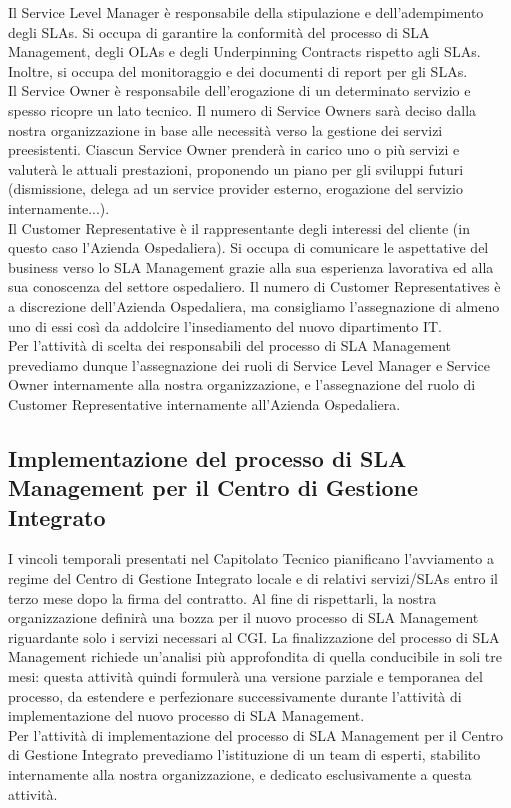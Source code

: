 Il Service Level Manager è responsabile della stipulazione e dell'adempimento degli SLAs. Si occupa di garantire la conformità del processo di SLA Management, degli OLAs e degli Underpinning Contracts rispetto agli SLAs. Inoltre, si occupa del monitoraggio e dei documenti di report per gli SLAs.
\\
Il Service Owner è responsabile dell'erogazione di un determinato servizio e spesso ricopre un lato tecnico. Il numero di Service Owners sarà deciso dalla nostra organizzazione in base alle necessità verso la gestione dei servizi preesistenti. Ciascun Service Owner prenderà in carico uno o più servizi e valuterà le attuali prestazioni, proponendo un piano per gli sviluppi futuri (dismissione, delega ad un service provider esterno, erogazione del servizio internamente...).
\\
Il Customer Representative è il rappresentante degli interessi del cliente (in questo caso l'Azienda Ospedaliera). Si occupa di comunicare le aspettative del business verso lo SLA Management grazie alla sua esperienza lavorativa ed alla sua conoscenza del settore ospedaliero. Il numero di Customer Representatives è a discrezione dell'Azienda Ospedaliera, ma consigliamo l'assegnazione di almeno uno di essi così da addolcire l'insediamento del nuovo dipartimento IT.
\\
Per l'attività di scelta dei responsabili del processo di SLA Management prevediamo dunque l'assegnazione dei ruoli di Service Level Manager e Service Owner internamente alla nostra organizzazione, e l'assegnazione del ruolo di Customer Representative internamente all'Azienda Ospedaliera.

\subsection{Implementazione del processo di SLA Management per il Centro di Gestione Integrato}

I vincoli temporali presentati nel Capitolato Tecnico pianificano l'avviamento a regime del Centro di Gestione Integrato locale e di relativi servizi/SLAs entro il terzo mese dopo la firma del contratto. Al fine di rispettarli, la nostra organizzazione definirà una bozza per il nuovo processo di SLA Management riguardante solo i servizi necessari al CGI. La finalizzazione del processo di SLA Management richiede un'analisi più approfondita di quella conducibile in soli tre mesi: questa attività quindi formulerà una versione parziale e temporanea del processo, da estendere e perfezionare successivamente durante l'attività di implementazione del nuovo processo di SLA Management.
\\
Per l'attività di implementazione del processo di SLA Management per il Centro di Gestione Integrato prevediamo l'istituzione di un team di esperti, stabilito internamente alla nostra organizzazione, e dedicato esclusivamente a questa attività.

